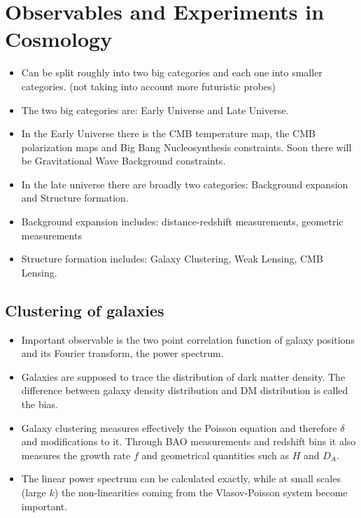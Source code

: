 \chapter{Observables and Experiments in Cosmology} %

\begin{itemize}
\item Can be split roughly into two big categories and each one into smaller
categories. (not taking into account more futuristic probes)
\item The two big categories are: Early Universe and Late Universe.
\item In the Early Universe there is the CMB temperature map, the CMB polarization
maps and Big Bang Nucleosynthesis constraints. Soon there will be
Gravitational Wave Background constraints.
\item In the late universe there are broadly two categories: Background
expansion and Structure formation. 
\item Background expansion includes: distance-redshift measurements, geometric
measurements
\item Structure formation includes: Galaxy Clustering, Weak Lensing, CMB
Lensing.
\end{itemize}


\label{ObsExp} %






\section{Clustering of galaxies}

\begin{itemize}
\item Important observable is the two point correlation function of galaxy
positions and its Fourier transform, the power spectrum.
\item Galaxies are supposed to trace the distribution of dark matter density.
The difference between galaxy density distribution and DM distribution
is called the bias.
\item Galaxy clustering measures effectively the Poisson equation and therefore
$\delta$ and modifications to it. Through BAO measurements and redshift
bins it also measures the growth rate $f$ and geometrical quantities
such as $H$ and $D_{A}$.
\item The linear power spectrum can be calculated exactly, while at small
scales (large $k$) the non-linearities coming from the Vlasov-Poisson
system become important.
\end{itemize}


